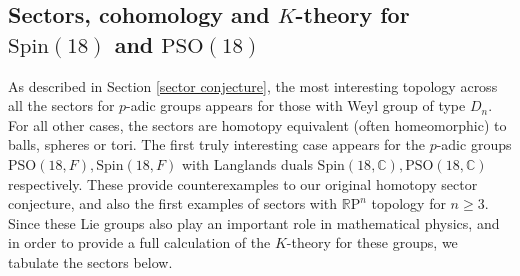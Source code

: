 \documentclass[11pt,a4paper]{article}
\def\Spin{\mathrm{Spin}}
\def\PSO{\mathrm{PSO}}
\def\R{\mathbb{R}}
\def\RP{\R\mathrm{P}}
\begin{document}
\newpage

\begin{appendix}
\section{Sectors, cohomology and $K$-theory for $\Spin(18) $ and $\PSO(18)$}
\label{appendixA}

As described in Section \ref{sector conjecture}, the most interesting topology across all the sectors for $p$-adic groups appears for those with Weyl group of type $D_n$. For all other cases, the sectors are homotopy equivalent (often homeomorphic) to balls, spheres or tori. The first truly interesting case appears for the $p$-adic groups $\PSO(18, F), \Spin(18,F)$  with Langlands duals $\Spin(18, \mathbb C), \PSO(18, \mathbb C)$ respectively. These provide counterexamples to our original homotopy sector conjecture, and also the first examples of sectors with $\RP^n$ topology for $n\geq 3$. Since these Lie groups also play an important role in mathematical physics, and in order to provide a full calculation of the $K$-theory for these groups, we tabulate the sectors below.



\def\tableheaderspinXVIII{Sectors, cohomology and $K$-theory for $\Spin(18)$ and $\PSO(18)$}


\end{appendix}
\end{document}
